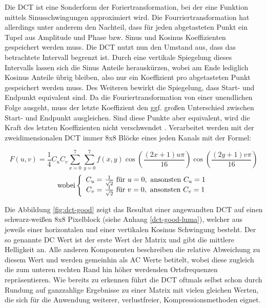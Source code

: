 Die DCT ist eine Sonderform der Foriertransformation, bei der eine Funktion mittels Sinusschwingungen approximiert wird. Die Fourriertransformation hat allerdings unter anderem den Nachteil, dass für jeden abgetasteten Punkt ein Tupel aus Amplitude und Phase bzw. Sinus und Kosinus Koeffizienten gespeichert werden muss. Die DCT nutzt nun den Umstand aus, dass das betrachtete Intervall begrenzt ist. Durch eine vertikale Spiegelung dieses Intervalls lassen sich die Sinus Anteile herauskürzen, wobei am Ende lediglich Kosinus Anteile übrig bleiben, also nur ein Koeffizient pro abgetasteten Punkt gespeichert werden muss. Des Weiteren bewirkt die Spiegelung, dass Start- und Endpunkt equivalent sind. Da die Fouriertransformation von einer unendlichen Folge ausgeht, muss der letzte Koeffizient den ggf. großen Unterschied zwischen Start- und Endpunkt ausgleichen. Sind diese Punkte aber equivalent, wird die Kraft des letzten Koeffizienten nicht verschwendet \cite{symes_peter_digital_2004}. Verarbeitet werden mit der zweidimensionalen DCT immer 8x8 Blöcke eines jeden Kanals mit der Formel:

\[ F(u,v) = \frac{1}{4} C_uC_v\sum_{x=0}^7 \sum_{y=0}^7 f(x,y) \cos \left(\frac{(2x+1)u\pi}{16}\right) \cos\left(\frac{(2y+1)v\pi}{16}\right) \]
\begin{align*}
	\text{wobei} \left\lbrace
  \begin{array}{r@{}l}
	  C_u = & \text{ } \frac{1}{\sqrt{2}} \text{ für } u=0, \text{ ansonsten } C_u=1\\
	  C_v = & \text{ } \frac{1}{\sqrt{2}} \text{ für } v=0, \text{ ansonsten } C_v=1
  \end{array}
  \right.
\end{align*}

Die Abbildung \ref{fig:dct-good} zeigt das Resultat einer angewandten DCT auf einen schwarz-weißen 8x8 Pixelblock (siehe Anhang \ref{dct-good-luma}), welcher aus jeweils einer horizontalen und einer vertikalen Kosinus Schwingung besteht. Der so genannte DC Wert ist der erste Wert der Matrix und gibt die mittlere Helligkeit an. Alle anderen Komponenten beschreiben die relative Abweichung zu diesem Wert und werden gemeinhin als AC Werte betitelt, wobei diese zugleich die zum unteren rechten Rand hin höher werdenden Ortsfrequenzen repräsentieren. Wie bereits zu erkennen führt die DCT oftmals selbst schon durch Rundung auf ganzzahlige Ergebnisse zu einer Matrix mit vielen gleichen Werten, die sich für die Anwendung weiterer, verlustfreier, Kompressionsmethoden eignet.

